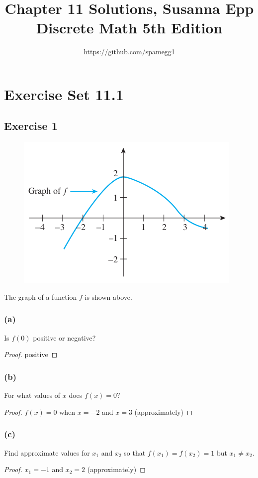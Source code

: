 \documentclass[14pt]{extarticle}
\title{Chapter 11 Solutions, Susanna Epp Discrete Math 5th Edition}
\author{https://github.com/spamegg1}
\begin{document}
\maketitle
\tableofcontents


\section{Exercise Set 11.1}

\subsection{Exercise 1}
\begin{figure}[ht!]
\centering
\includegraphics[scale=0.5]{../images/11.1.1.png}
\end{figure}

The graph of a function \(f\) is shown above.

\subsubsection{(a)}
Is \(f(0)\) positive or negative?
\begin{proof}
positive
\end{proof}

\subsubsection{(b)}
For what values of \(x\) does \(f(x) = 0\)?
\begin{proof}
\(f(x) = 0\) when \(x = -2\) and \(x = 3\) (approximately)
\end{proof}

\subsubsection{(c)}
Find approximate values for \(x_1\) and \(x_2\) so that \(f(x_1) = f(x_2) = 1\) but \(x_1 \neq x_2\).
\begin{proof}
\(x_1 = -1\) and \(x_2 = 2\) (approximately)
\end{proof}
\end{document}
